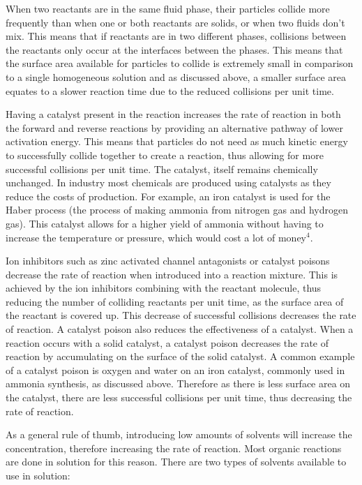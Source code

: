 When two reactants are in the same fluid phase, their particles collide more frequently than when one or both reactants are solids, or when two fluids don't mix. This means that if reactants are in two different phases, collisions between the reactants only occur at the interfaces between the phases. This means that the surface area available for particles to collide is extremely small in comparison to a single homogeneous solution and as discussed above, a smaller surface area equates to a slower reaction time due to the reduced collisions per unit time.

Having a catalyst present in the reaction increases the rate of reaction in both the forward and reverse reactions by providing an alternative pathway of lower activation energy. This means that particles do not need as much kinetic energy to successfully collide together to create a reaction, thus allowing for more successful collisions per unit time. The catalyst, itself remains chemically unchanged. In industry most chemicals are produced using catalysts as they reduce the costs of production. For example, an iron catalyst is used for the Haber process (the process of making ammonia from nitrogen gas and hydrogen gas). This catalyst allows for a higher yield of ammonia without having to increase the temperature or pressure, which would cost a lot of money$^4$.

Ion inhibitors such as zinc activated channel antagonists or catalyst poisons decrease the rate of reaction when introduced into a reaction mixture. This is achieved by the ion inhibitors combining with the reactant molecule, thus reducing the number of colliding reactants per unit time, as the surface area of the reactant is covered up. This decrease of successful collisions decreases the rate of reaction. A catalyst poison also reduces the effectiveness of a catalyst. When a reaction occurs with a solid catalyst, a catalyst poison decreases the rate of reaction by accumulating on the surface of the solid catalyst. A common example of a catalyst poison is oxygen and water on an iron catalyst, commonly used in ammonia synthesis, as discussed above. Therefore as there is less surface area on the catalyst, there are less successful collisions per unit time, thus decreasing the rate of reaction.

As a general rule of thumb, introducing low amounts of solvents will increase the concentration, therefore increasing the rate of reaction. Most organic reactions are done in solution for this reason. There are two types of solvents available to use in solution:

